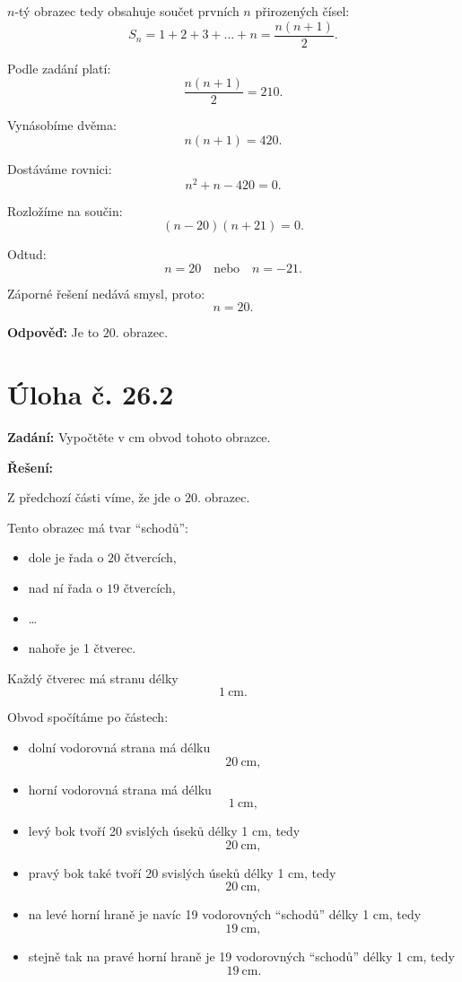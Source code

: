 \documentclass[12pt,a4paper]{article}
\begin{document}
\(n\)-tý obrazec tedy obsahuje součet prvních \(n\) přirozených čísel:
\[
S_n = 1+2+3+\dots+n = \frac{n(n+1)}{2}.
\]

Podle zadání platí:
\[
\frac{n(n+1)}{2}=210.
\]

Vynásobíme dvěma:
\[
n(n+1)=420.
\]

Dostáváme rovnici:
\[
n^2+n-420=0.
\]

Rozložíme na součin:
\[
(n-20)(n+21)=0.
\]

Odtud:
\[
n=20 \quad \text{nebo} \quad n=-21.
\]

Záporné řešení nedává smysl, proto:
\[
n=20.
\]

\bigskip

\textbf{Odpověď:}  
Je to \(20.\) obrazec.



\section*{Úloha č. 26.2}
\textbf{Zadání:}  
Vypočtěte v cm obvod tohoto obrazce.

\bigskip

\textbf{Řešení:}

Z předchozí části víme, že jde o \(20.\) obrazec.

Tento obrazec má tvar ``schodů'':
\begin{itemize}
    \item dole je řada o \(20\) čtvercích,
    \item nad ní řada o \(19\) čtvercích,
    \item \dots
    \item nahoře je 1 čtverec.
\end{itemize}

Každý čtverec má stranu délky
\[
1\ \mathrm{cm}.
\]

\medskip

Obvod spočítáme po částech:
\begin{itemize}
    \item dolní vodorovná strana má délku
    \[
    20\ \mathrm{cm},
    \]
    \item horní vodorovná strana má délku
    \[
    1\ \mathrm{cm},
    \]
    \item levý bok tvoří 20 svislých úseků délky 1 cm, tedy
    \[
    20\ \mathrm{cm},
    \]
    \item pravý bok také tvoří 20 svislých úseků délky 1 cm, tedy
    \[
    20\ \mathrm{cm},
    \]
    \item na levé horní hraně je navíc 19 vodorovných ``schodů'' délky 1 cm, tedy
    \[
    19\ \mathrm{cm},
    \]
    \item stejně tak na pravé horní hraně je 19 vodorovných ``schodů'' délky 1 cm, tedy
    \[
    19\ \mathrm{cm}.
    \]
\end{itemize}
\end{document}
